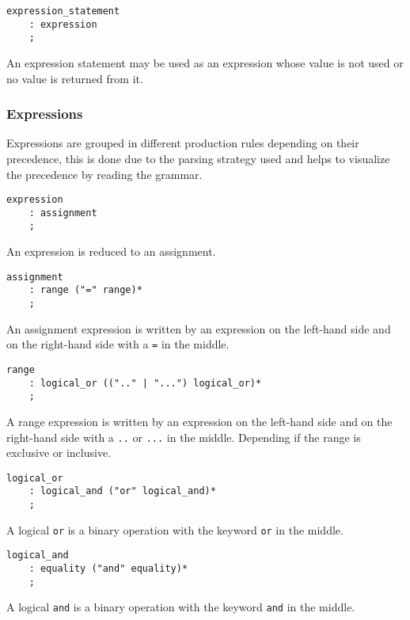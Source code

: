 \begin{lstlisting}
expression_statement
    : expression
    ;
\end{lstlisting}

An expression statement may be used as an expression whose value is not used or no value is returned from it.

\subsubsection{Expressions}
\label{sec:grammar_expressions}

Expressions are grouped in different production rules depending on their precedence, this is done due to the parsing strategy used and
helps to visualize the precedence by reading the grammar.

\begin{lstlisting}
expression
    : assignment
    ;
\end{lstlisting}

An expression is reduced to an assignment.

\begin{lstlisting}
assignment
    : range ("=" range)*
    ;
\end{lstlisting}

An assignment expression is written by an expression on the left-hand side and on the right-hand side with a \texttt{=} in the middle.

\begin{lstlisting}
range
    : logical_or ((".." | "...") logical_or)*
    ;
\end{lstlisting}

A range expression is written by an expression on the left-hand side and on the right-hand side with a \texttt{..} or \texttt{...} in the middle. Depending
if the range is exclusive or inclusive.

\begin{lstlisting}
logical_or
    : logical_and ("or" logical_and)*
    ;
\end{lstlisting}

A logical \texttt{or} is a binary operation with the keyword \texttt{or} in the middle.

\begin{lstlisting}
logical_and
    : equality ("and" equality)*
    ;
\end{lstlisting}

A logical \texttt{and} is a binary operation with the keyword \texttt{and} in the middle.

